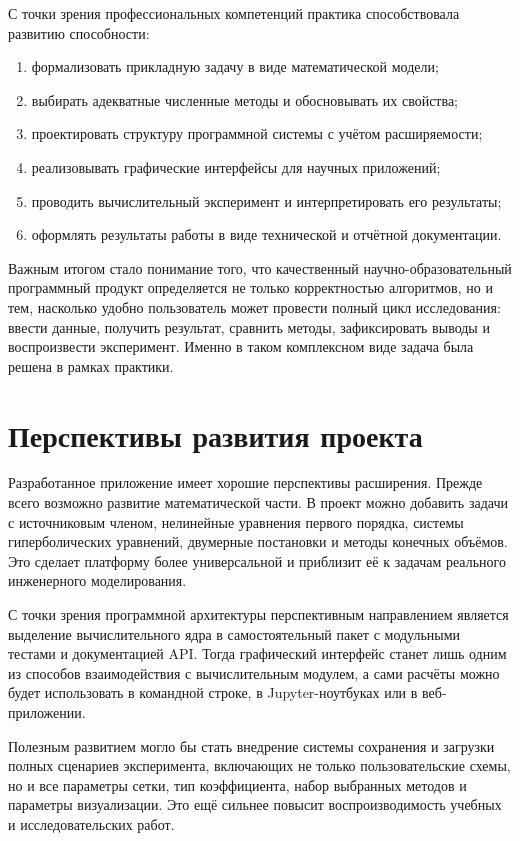 \documentclass[a4paper,14pt]{extreport}
\begin{document}
С точки зрения профессиональных компетенций практика способствовала развитию способности:

\begin{enumerate}
    \item формализовать прикладную задачу в виде математической модели;
    \item выбирать адекватные численные методы и обосновывать их свойства;
    \item проектировать структуру программной системы с учётом расширяемости;
    \item реализовывать графические интерфейсы для научных приложений;
    \item проводить вычислительный эксперимент и интерпретировать его результаты;
    \item оформлять результаты работы в виде технической и отчётной документации.
\end{enumerate}

Важным итогом стало понимание того, что качественный научно-образовательный программный продукт определяется не только корректностью алгоритмов, но и тем, насколько удобно пользователь может провести полный цикл исследования: ввести данные, получить результат, сравнить методы, зафиксировать выводы и воспроизвести эксперимент. Именно в таком комплексном виде задача была решена в рамках практики.

\chapter{Перспективы развития проекта}

Разработанное приложение имеет хорошие перспективы расширения. Прежде всего возможно развитие математической части. В проект можно добавить задачи с источниковым членом, нелинейные уравнения первого порядка, системы гиперболических уравнений, двумерные постановки и методы конечных объёмов. Это сделает платформу более универсальной и приблизит её к задачам реального инженерного моделирования.

С точки зрения программной архитектуры перспективным направлением является выделение вычислительного ядра в самостоятельный пакет с модульными тестами и документацией API. Тогда графический интерфейс станет лишь одним из способов взаимодействия с вычислительным модулем, а сами расчёты можно будет использовать в командной строке, в Jupyter-ноутбуках или в веб-приложении.

Полезным развитием могло бы стать внедрение системы сохранения и загрузки полных сценариев эксперимента, включающих не только пользовательские схемы, но и все параметры сетки, тип коэффициента, набор выбранных методов и параметры визуализации. Это ещё сильнее повысит воспроизводимость учебных и исследовательских работ.
\end{document}
